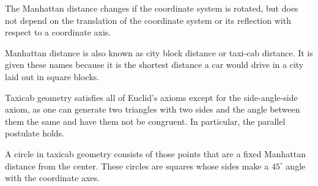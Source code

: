 The Manhattan distance changes if the coordinate system is rotated, but does not depend on the translation of the coordinate system or its reflection with respect to a coordinate axis.

Manhattan distance is also known as city block distance or taxi-cab distance. It is given these names because it is the shortest distance a car would drive in a city laid out in square blocks. 

Taxicab geometry satisfies all of Euclid's axioms except for the side-angle-side axiom, as one can generate two triangles with two sides and the angle between them the same and have them not be congruent. In particular, the parallel postulate holds.

A circle in taxicab geometry consists of those points that are a fixed Manhattan distance from the center. These circles are squares whose sides make a $45^\circ$ angle with the coordinate axes.

